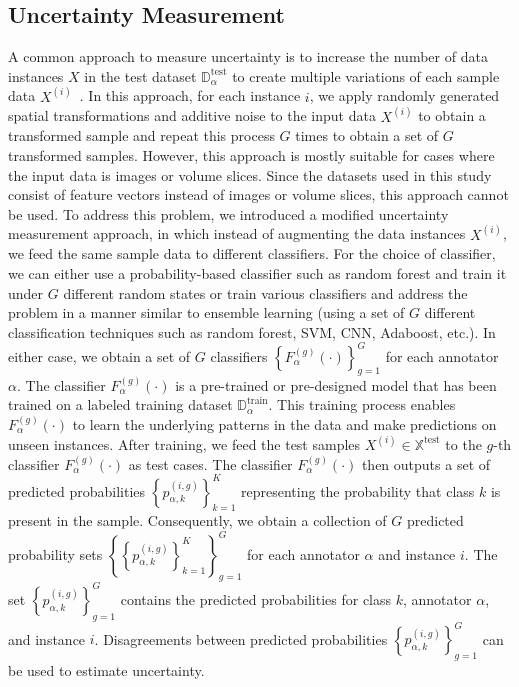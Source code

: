 \subsection{Uncertainty Measurement}
A common approach to measure uncertainty is to increase the number of data instances $X $ in the test dataset $\mathbb{D}_\alpha^{\mathrm{test}} $ to create multiple variations of each sample data $X^{(i)} $~\cite{ayhan_TestTime_2018}. In this approach, for each instance $i $, we apply randomly generated spatial transformations and additive noise to the input data $X^{(i)} $ to obtain a transformed sample and repeat this process $G $ times to obtain a set of $G $ transformed samples.
However, this approach is mostly suitable for cases where the input data is images or volume slices. Since the datasets used in this study consist of feature vectors instead of images or volume slices, this approach cannot be used. To address this problem, we introduced a modified uncertainty measurement approach, in which instead of augmenting the data instances $X^{(i)} $, we feed the same sample data to different classifiers.
For the choice of classifier, we can either use a probability-based classifier such as random forest and train it under $G $ different random states or train various classifiers and address the problem in a manner similar to ensemble learning (using a set of $G $ different classification techniques such as random forest, SVM, CNN, Adaboost, etc.). In either case, we obtain a set of $G $ classifiers ${\left\{F_{\alpha}^{(g)}( \cdot)\right\}}_{g=1}^G $ for each annotator $\alpha $. The classifier $F_{\alpha}^{(g)}( \cdot) $ is a pre-trained or pre-designed model that has been trained on a labeled training dataset $\mathbb{D}_\alpha^{\mathrm{train}} $. This training process enables $F_{\alpha}^{(g)}(\cdot) $ to learn the underlying patterns in the data and make predictions on unseen instances.
After training, we feed the test samples $X^{(i)}\in \mathbb{X}^{\text{test}} $ to the $g $-th classifier $F_{\alpha}^{(g)}(\cdot) $ as test cases. The classifier $F_{\alpha}^{(g)}(\cdot) $ then outputs a set of predicted probabilities ${\left\{p_{\alpha,k}^{(i,g)}\right\}}_{k=1}^{K} $ representing the probability that class $k $ is present in the sample. Consequently, we obtain a collection of $G $ predicted probability sets $ {\left\{ {\left\{ p_{\alpha,k}^{(i,g)}\right\}}_{k=1}^K \right\}}_{g=1}^G $ for each annotator $\alpha $ and instance $i $. The set ${\left\{p_{\alpha,k}^{(i,g)}\right\}}_{g=1}^G $ contains the predicted probabilities for class $k $, annotator $\alpha $, and instance $i $. Disagreements between predicted probabilities ${\left\{p_{\alpha,k}^{(i,g)}\right\}}_{g=1}^G $ can be used to estimate uncertainty.
